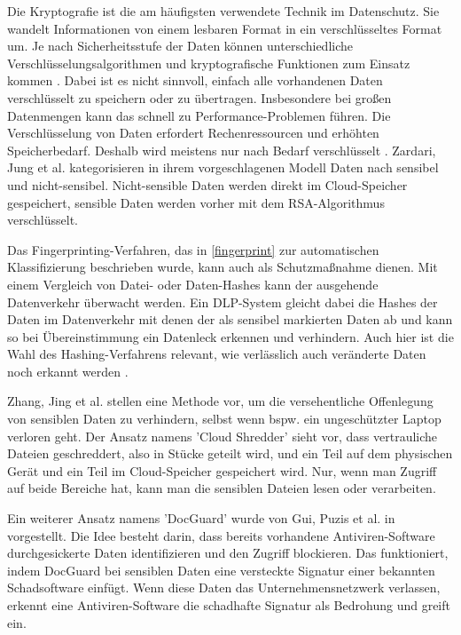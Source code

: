 Die Kryptografie ist die am häufigsten verwendete Technik im Datenschutz. Sie wandelt Informationen von einem lesbaren Format in ein verschlüsseltes Format um. Je nach Sicherheitsstufe der Daten können unterschiedliche Verschlüsselungsalgorithmen und kryptografische Funktionen zum Einsatz kommen \cite{HerreraMontano.2022}. Dabei ist es nicht sinnvoll, einfach alle vorhandenen Daten verschlüsselt zu speichern oder zu übertragen. Insbesondere bei großen Datenmengen kann das schnell zu Performance-Problemen führen. Die Verschlüsselung von Daten erfordert Rechenressourcen und erhöhten Speicherbedarf. Deshalb wird meistens nur nach Bedarf verschlüsselt \cite{Arki.2023}.
Zardari, Jung et al. \cite{Zardari.2014} kategorisieren in ihrem vorgeschlagenen Modell Daten nach sensibel und nicht-sensibel. Nicht-sensible Daten werden direkt im Cloud-Speicher gespeichert, sensible Daten werden vorher mit dem RSA-Algorithmus verschlüsselt.

Das Fingerprinting-Verfahren, das in \ref{fingerprint} zur automatischen Klassifizierung beschrieben wurde, kann auch als Schutzmaßnahme dienen. Mit einem Vergleich von Datei- oder Daten-Hashes kann der ausgehende Datenverkehr überwacht werden. Ein DLP-System gleicht dabei die Hashes der Daten im Datenverkehr mit denen der als sensibel markierten Daten ab und kann so bei Übereinstimmung ein Datenleck erkennen und verhindern. Auch hier ist die Wahl des Hashing-Verfahrens relevant, wie verlässlich auch veränderte Daten noch erkannt werden \cite{HerreraMontano.2022}.

Zhang, Jing et al. \cite{Zhang.2011} stellen eine Methode vor, um die versehentliche Offenlegung von sensiblen Daten zu verhindern, selbst wenn bspw. ein ungeschützter Laptop verloren geht. Der Ansatz namens 'Cloud Shredder' sieht vor, dass vertrauliche Dateien geschreddert, also in Stücke geteilt wird, und ein Teil auf dem physischen Gerät und ein Teil im Cloud-Speicher gespeichert wird. Nur, wenn man Zugriff auf beide Bereiche hat, kann man die sensiblen Dateien lesen oder verarbeiten.

Ein weiterer Ansatz namens 'DocGuard' wurde von Gui, Puzis et al. in \cite{Guri.2019} vorgestellt. Die Idee besteht darin, dass bereits vorhandene Antiviren-Software durchgesickerte Daten identifizieren und den Zugriff blockieren. Das funktioniert, indem DocGuard bei sensiblen Daten eine versteckte Signatur einer bekannten Schadsoftware einfügt. Wenn diese Daten das Unternehmensnetzwerk verlassen, erkennt eine Antiviren-Software die schadhafte Signatur als Bedrohung und greift ein.

